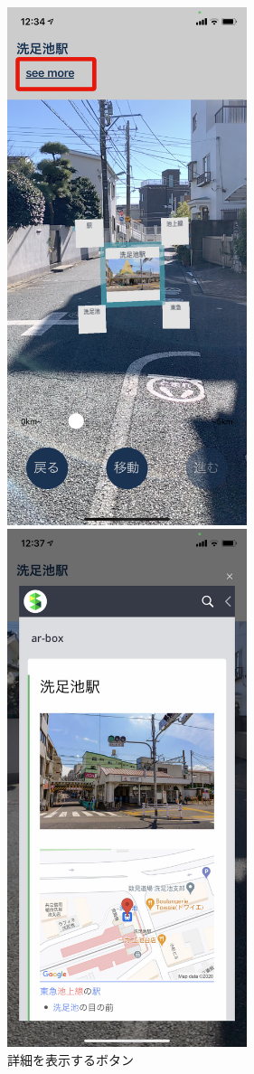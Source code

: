 \begin{figure}[htbp]
  \begin{minipage}{0.5\hsize}
    \centering
    \includegraphics[width=70mm]{images/hypar_touch_top.png}
    \caption{詳細を表示するボタン} \label{fig:hypar_touch_top}
  \end{minipage}
  \begin{minipage}{0.5\hsize}
    \centering
    \includegraphics[width=70mm]{images/hypar_touch_webview.png}

\end{minipage}
\end{figure}
